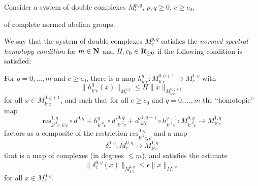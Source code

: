 Consider a system of double complexes $M^{p,q}_c$, $p,q\geq 0$, $c\geq c_0$,
\begin{center}
\end{center}
of complete normed abelian groups.

\begin{definition}
  \label{spectral-htpy}
  \leanok
  We say that the system of double complexes $M^{p,q}_c$
  satisfies the \emph{normed spectral homotopy condition}
  for $m \in \mathbf{N}$ and $H, c_0 \in \mathbf{R}_{\ge 0}$
  if the following condition is satisfied:

  For $q=0,\ldots,m$ and $c\geq c_0$,
  there is a map $h^q_{k'c} \colon M^{0,q+1}_{k'c}\to M^{1,q}_c$ with
  \[
    \|h^q_{k'c}(x)\|_{M^{1,q}_c} \leq H\|x\|_{M^{0,q+1}_{k'c}}
  \]
  for all $x\in M^{0,q+1}_{k'c}$,
  and such that for all $c\geq c_0$ and $q=0,\ldots,m$ the ``homotopic'' map
  \[
    \mathrm{res}_{k'^2c,k'c}^{1,q}\circ d^{0,q} +
    h^q_{k'^2c}\circ d'^{0,q}_{k'^2c} +
    d'^{1,q-1}_{k'c}\circ h^{q-1}_{k'^2c} \colon
      M^{0,q}_{k'^2c}\to M^{1,q}_{k'c}
  \]
  factors as a composite of the restriction $\mathrm{res}_{k'^2c,c}^{0,q}$ and a map
  \[
    \delta^{0,q}_c \colon M^{0,q}_c\to M^{1,q}_{k'c}
  \]
  that is a map of complexes (in degrees $\leq m$), and satisfies the estimate
  \begin{equation}\label{eq:homotopicmapsmall}
  \|\delta^{0,q}_c(x)\|_{M^{1,q}_{k'c}}\leq \epsilon \|x\|_{M^{0,q}_c}
  \end{equation}
  for all $x\in M^{0,q}_c$.
\end{definition}


